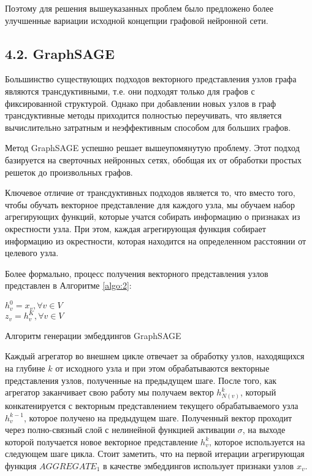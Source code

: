 Поэтому для решения вышеуказанных проблем было предложено более улучшенные вариации исходной концепции графовой нейронной сети. 


\subsection{4.2. GraphSAGE}

Большинство существующих подходов векторного представления узлов графа являются трансдуктивными, т.е. они подходят только для графов с фиксированной структурой. Однако при добавлении новых узлов в граф трансдуктивные методы приходится полностью переучивать, что является вычислительно затратным и неэффективным способом для больших графов.

Метод GraphSAGE \cite{GraphSAGE } успешно решает вышеупомянутую проблему. Этот подход базируется на сверточных нейронных сетях, обобщая их от обработки простых решеток до произвольных графов. 

Ключевое отличие от трансдуктивных подходов является то, что вместо того, чтобы обучать векторное представление для каждого узла, мы обучаем набор агрегирующих функций, которые учатся собирать информацию о признаках из окрестности узла. При этом, каждая агрегирующая функция собирает информацию из окрестности, которая находится на определенном расстоянии от целевого узла. 

Более формально, процесс получения векторного представления узлов представлен в Алгоритме \ref{algo:2}:

\begin{algorithm}[H]
  $ h_v^0 = x_v, \forall v \in V$ \\
  $z_v = h_v^K, \forall v \in V$

    \caption{Алгоритм генерации эмбеддингов GraphSAGE}
    \label{algo:2}
\end{algorithm}

Каждый агрегатор во внешнем цикле отвечает за обработку узлов, находящихся на глубине $k$ от исходного узла и при этом обрабатываются векторные представления узлов, полученные на предыдущем шаге. После того, как агрегатор заканчивает свою работу мы получаем вектор $h_{N(v)}^k$, который конкатенируется с векторным представлением текущего обрабатываемого узла $h_v^{k-1}$, которое получено на предыдущем шаге. Полученный вектор проходит через полно-связный слой с нелинейной функцией активации $\sigma$, на выходе которой получается новое векторное представление $h_v^k$, которое используется на следующем шаге цикла.
Стоит заметить, что на первой итерации агрегирующая функция $AGGREGATE_1$ в качестве эмбеддингов использует признаки узлов $x_v$.  

